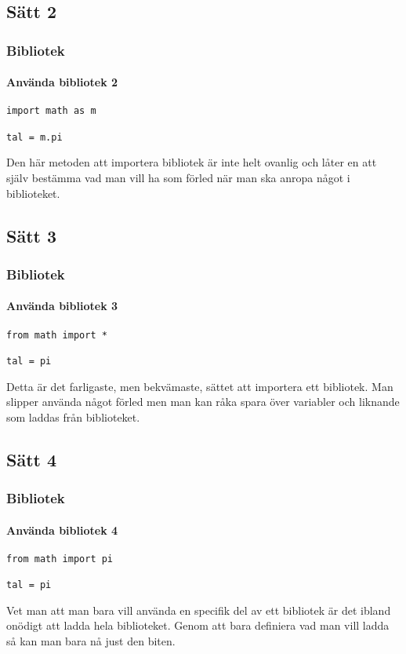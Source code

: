 \documentclass{beamer}
\begin{document}
\subsection{Sätt 2}

\begin{frame}[fragile]
	\frametitle{Bibliotek}
	\framesubtitle{Använda bibliotek 2}
	
	\begin{lstlisting}
import math as m

tal = m.pi
	\end{lstlisting}
	
	Den här metoden att importera bibliotek är inte helt ovanlig och låter en att själv bestämma vad man vill ha som förled när man ska anropa något i biblioteket. 

\end{frame}

\subsection{Sätt 3}

\begin{frame}[fragile]
	\frametitle{Bibliotek}
	\framesubtitle{Använda bibliotek 3}
	
	\begin{lstlisting}
from math import *

tal = pi
	\end{lstlisting}
	
	Detta är det farligaste, men bekvämaste, sättet att importera ett bibliotek. Man slipper använda något förled men man kan råka spara över variabler och liknande som laddas från biblioteket. 

\end{frame}

\subsection{Sätt 4}

\begin{frame}[fragile]
	\frametitle{Bibliotek}
	\framesubtitle{Använda bibliotek 4}
	
	\begin{lstlisting}
from math import pi

tal = pi
	\end{lstlisting}
	
	Vet man att man bara vill använda en specifik del av ett bibliotek är det ibland onödigt att ladda hela biblioteket. Genom att bara definiera vad man vill ladda så kan man bara nå just den biten.

\end{frame}
\end{document}
